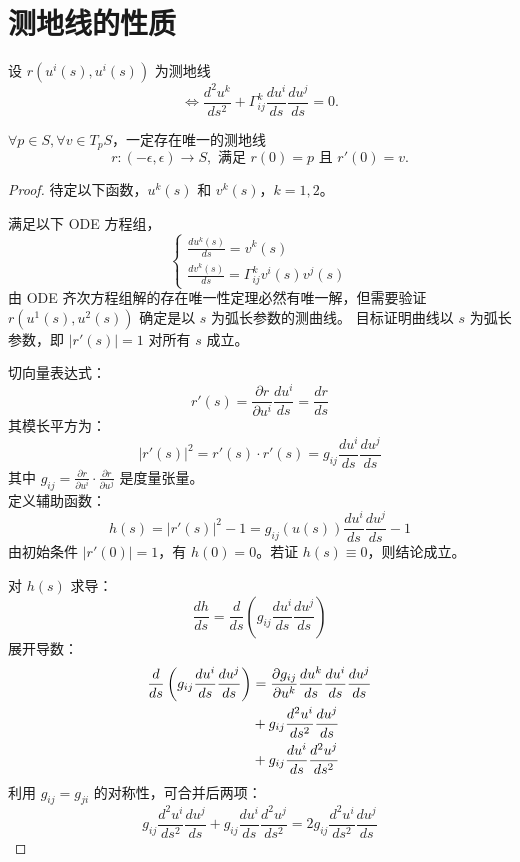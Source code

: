 \documentclass[lang=cn,10pt,thmcnt=section]{elegantbook}
\begin{document}
\section{测地线的性质}
设 \( r(u^i(s), u^i(s)) \) 为测地线
\[
\Leftrightarrow \frac{d^2 u^k}{ds^2} + \Gamma^k_{ij} \frac{du^i}{ds} \frac{du^j}{ds} = 0.
\]
\begin{theorem}
    \(\forall p \in S, \forall v \in T_pS\)，一定存在唯一的测地线
\[
r: (-\epsilon, \epsilon) \rightarrow S, \text{ 满足 } r(0) = p \text{ 且 } r'(0) = v.
\]
\end{theorem}
\begin{proof}
    待定以下函数，\( u^k(s) \) 和 \( v^k(s) \)，\( k = 1, 2 \)。

    满足以下 ODE 方程组，
    \[
    \begin{cases}
    \frac{d u^k(s)}{ds} = v^k(s) \\
    \frac{d v^k(s)}{ds} = \Gamma^k_{ij} v^i(s) v^j(s)
    \end{cases}
    \]
    由 ODE 齐次方程组解的存在唯一性定理必然有唯一解，但需要验证 \( r(u^1(s), u^2(s)) \) 确定是以 \( s \) 为弧长参数的测曲线。
目标证明曲线以 \( s \) 为弧长参数，即 \( |r'(s)| = 1 \) 对所有 \( s \) 成立。


切向量表达式：
\[
r'(s) = \frac{\partial r}{\partial u^i} \frac{du^i}{ds} = \frac{dr}{ds}
\]
其模长平方为：
\[
|r'(s)|^2 = r'(s) \cdot r'(s) = g_{ij} \frac{du^i}{ds} \frac{du^j}{ds}
\]
其中 \( g_{ij} = \frac{\partial r}{\partial u^i} \cdot \frac{\partial r}{\partial u^j} \) 是度量张量。\\
定义辅助函数：
\[
h(s) = |r'(s)|^2 - 1 = g_{ij}(u(s)) \frac{du^i}{ds} \frac{du^j}{ds} - 1
\]
由初始条件 \( |r'(0)| = 1 \)，有 \( h(0) = 0 \)。若证 \( h(s) \equiv 0 \)，则结论成立。


对 \( h(s) \) 求导：
\[
\frac{dh}{ds} = \frac{d}{ds}\left(g_{ij} \frac{du^i}{ds} \frac{du^j}{ds}\right)
\]
展开导数：
\begin{align}
\frac{d}{ds}\left(g_{ij} \frac{du^i}{ds} \frac{du^j}{ds}\right) 
&= \frac{\partial g_{ij}}{\partial u^k} \frac{du^k}{ds} \frac{du^i}{ds} \frac{du^j}{ds} \notag \\
&+ g_{ij} \frac{d^2 u^i}{ds^2} \frac{du^j}{ds} \notag \\
&+ g_{ij} \frac{du^i}{ds} \frac{d^2 u^j}{ds^2} \label{eq:deriv}
\end{align}
利用 \( g_{ij} = g_{ji} \) 的对称性，可合并后两项：
\[
g_{ij} \frac{d^2 u^i}{ds^2} \frac{du^j}{ds} + g_{ij} \frac{du^i}{ds} \frac{d^2 u^j}{ds^2} = 2g_{ij} \frac{d^2 u^i}{ds^2} \frac{du^j}{ds}
\]


\end{proof}
\end{document}
